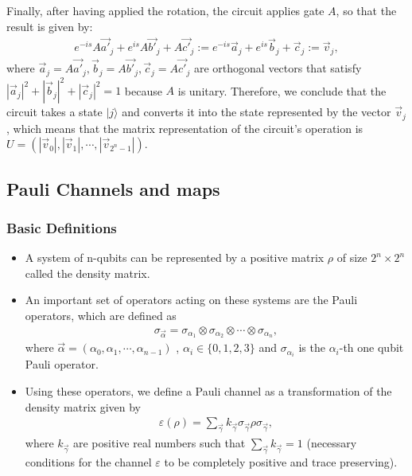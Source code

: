 Finally, after having applied the rotation, the circuit applies gate $A$, 
so that the result is given by:
\begin{eqnarray}
e^{-is} A \vec{a'}_j + e^{is} A \vec{b'}_j + A \vec{c'}_j := e^{-is} \vec{a}_j + e^{is} \vec{b}_j + \vec{c}_j := \vec{v}_j,
\end{eqnarray}
where $\vec{a}_j = A \vec{a'}_j , \vec{b}_j = A \vec{b'}_j , \vec{c}_j = A \vec{c'}_j$ are orthogonal
vectors that satisfy $|\vec{a}_j|^2 + |\vec{b}_j|^2 + |\vec{c}_j|^2 = 1$ because $A$ is unitary. 
Therefore, we conclude that the circuit takes a state $|j\rangle$ and converts it
 into the state represented by the vector $\vec{v}_j$, which means that the matrix representation of the circuit's operation is
 $U = (|\vec{v}_0|, |\vec{v}_1|, \cdots, |\vec{v}_{2^n-1}|)$. \\
\subsection{Pauli Channels and maps}
\subsubsection{Basic Definitions}

\begin{itemize}
\item A system of n-qubits can be represented by a positive matrix $\rho$ of size $2^n \times 2^n$ called the density matrix.
\item  An important set of operators acting on these systems are the Pauli operators, which are defined as
\begin{eqnarray}
\sigma_{\vec{\alpha}} = \sigma_{\alpha_1} \otimes \sigma_{\alpha_2} \otimes \cdots \otimes \sigma_{\alpha_n},
\end{eqnarray}
where $\vec{\alpha} = (\alpha_0, \alpha_1, \cdots , \alpha_{n-1})$ , $\alpha_i \in \{0,1,2,3\}$ and $\sigma_{\alpha_i}$ is the $\alpha_i$-th one qubit Pauli operator. \\

\item Using these operators, we define a Pauli channel as a transformation of the density matrix given by
\begin{eqnarray}
\varepsilon(\rho) = \sum_{\vec{\gamma}} k_{\vec{\gamma}} \sigma_{\vec{\gamma}} \rho \sigma_{\vec{\gamma}} ,
\end{eqnarray}
where $k_{\vec{\gamma}}$ are positive real numbers such that $\sum_{\vec{\gamma}} k_{\vec{\gamma}} = 1$ (necessary conditions for the channel $\varepsilon$ to be completely positive and trace preserving).\\
\end{itemize}

